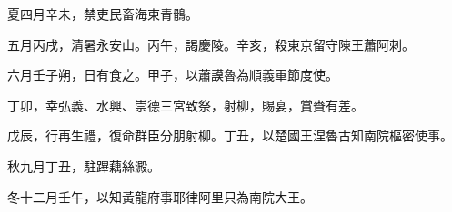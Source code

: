 \begin{pinyinscope}
 夏四月辛未，禁吏民畜海東青鶻。



 五月丙戌，清暑永安山。丙午，謁慶陵。辛亥，殺東京留守陳王蕭阿刺。



 六月壬子朔，日有食之。甲子，以蕭謨魯為順義軍節度使。



 丁卯，幸弘義、水興、崇德三宮致祭，射柳，賜宴，賞賚有差。



 戊辰，行再生禮，復命群臣分朋射柳。丁丑，以楚國王涅魯古知南院樞密使事。



 秋九月丁丑，駐蹕藕絲澱。



 冬十二月壬午，以知黃龍府事耶律阿里只為南院大王。



\end{pinyinscope}